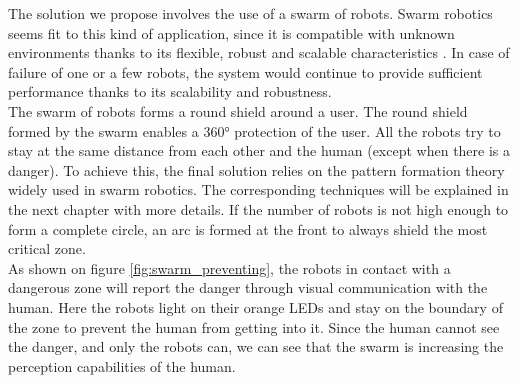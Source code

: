 \documentclass[oneside, a4paper, 12pt]{memoir}
\begin{document}
	The solution we propose involves the use of a swarm of robots. Swarm robotics seems fit to this kind of application, since it is compatible with unknown environments thanks to its flexible, robust and scalable characteristics \citep{brambilla2013swarm}. In case of failure of one or a few robots, the system would continue to provide sufficient performance thanks to its scalability and robustness.\\
	
	The swarm of robots forms a round shield around a user. The round shield formed by the swarm enables a 360° protection of the user. All the robots try to stay at the same distance from each other and the human (except when there is a danger). To achieve this, the final solution relies on the pattern formation theory widely used in swarm robotics. The corresponding techniques will be explained in the next chapter with more details. If the number of robots is not high enough to form a complete circle, an arc is formed at the front to always shield the most critical zone.\\
	
	As shown on figure \ref{fig:swarm_preventing}, the robots in contact with a dangerous zone will report the danger through visual communication with the human. Here the robots light on their orange LEDs and stay on the boundary of the zone to prevent the human from getting into it. Since the human cannot see the danger, and only the robots can, we can see that the swarm is increasing the perception capabilities of the human.\\
		
\end{document}
